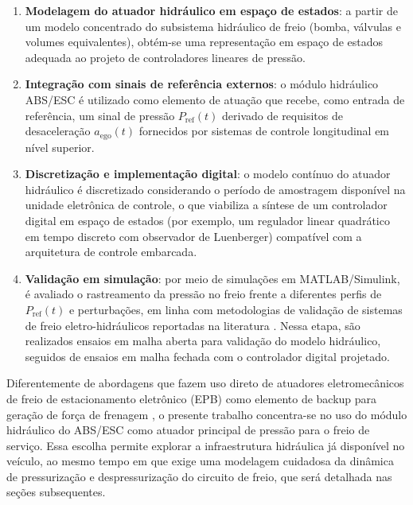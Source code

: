 \begin{enumerate}
    \item \textbf{Modelagem do atuador hidráulico em espaço de estados}: a partir de um modelo concentrado do subsistema hidráulico de freio (bomba, válvulas e volumes equivalentes), obtém-se uma representação em espaço de estados adequada ao projeto de controladores lineares de pressão.

    \item \textbf{Integração com sinais de referência externos}: o módulo hidráulico ABS/ESC é utilizado como elemento de atuação que recebe, como entrada de referência, um sinal de pressão $P_{\mathrm{ref}}(t)$ derivado de requisitos de desaceleração $a_{\mathrm{ego}}(t)$ fornecidos por sistemas de controle longitudinal em nível superior.

    \item \textbf{Discretização e implementação digital}: o modelo contínuo do atuador hidráulico é discretizado considerando o período de amostragem disponível na unidade eletrônica de controle, o que viabiliza a síntese de um controlador digital em espaço de estados (por exemplo, um regulador linear quadrático em tempo discreto com observador de Luenberger) compatível com a arquitetura de controle embarcada.

    \item \textbf{Validação em simulação}: por meio de simulações em MATLAB/Simulink, é avaliado o rastreamento da pressão no freio frente a diferentes perfis de $P_{\mathrm{ref}}(t)$ e perturbações, em linha com metodologias de validação de sistemas de freio eletro-hidráulicos reportadas na literatura \cite{ZengYangHuang2023,MotorParametricDesign2023}. Nessa etapa, são realizados ensaios em malha aberta para validação do modelo hidráulico, seguidos de ensaios em malha fechada com o controlador digital projetado.
\end{enumerate}

Diferentemente de abordagens que fazem uso direto de atuadores eletromecânicos de freio de estacionamento eletrônico (EPB) como elemento de backup para geração de força de frenagem \cite{HouhuaJingShihao2023}, o presente trabalho concentra-se no uso do módulo hidráulico do ABS/ESC como atuador principal de pressão para o freio de serviço. Essa escolha permite explorar a infraestrutura hidráulica já disponível no veículo, ao mesmo tempo em que exige uma modelagem cuidadosa da dinâmica de pressurização e despressurização do circuito de freio, que será detalhada nas seções subsequentes.


